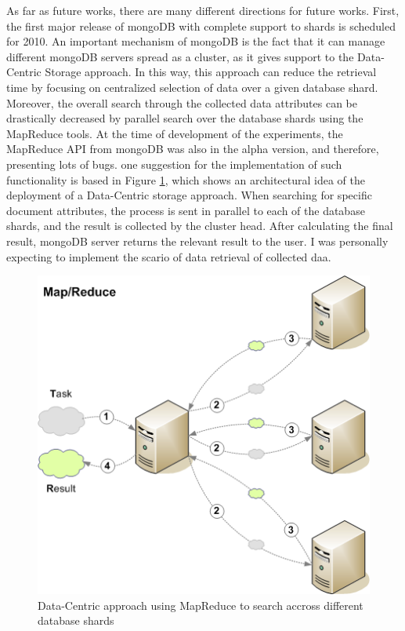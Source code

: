 As far as future works, there are many different directions for future works.
First, the first major release of mongoDB with complete support to shards is
scheduled for 2010. An important mechanism of mongoDB is the fact that it can
manage different mongoDB servers spread as a cluster, as it gives support to
the Data-Centric Storage approach. In this way, this approach can reduce the
retrieval time by focusing on centralized selection of data over a given
database shard. Moreover, the overall search through the collected data
attributes can be drastically decreased by parallel search over the database
shards using the MapReduce \cite{map-reduce} tools. At the time of development
of the experiments, the MapReduce API from mongoDB was also in the alpha
version, and therefore, presenting lots of bugs. one suggestion for the
implementation of such functionality is based in Figure
\ref{fig:future-works-data-centric-map-reduce}, which shows an architectural
idea of the deployment of a Data-Centric storage approach. When searching for
specific document attributes, the process is sent in parallel to each of the
database shards, and the result is collected by the cluster head. After
calculating the final result, mongoDB server returns the relevant result to
the user. I was personally expecting to implement the scario of data retrieval
of collected daa.

\begin{figure}[h]
  \centering
  \includegraphics[scale=0.5]{../diagrams/future-works-data-centric-map-reduce}
  \caption{Data-Centric approach using MapReduce to search accross different
  database shards}
  \label{fig:future-works-data-centric-map-reduce}
\end{figure}

